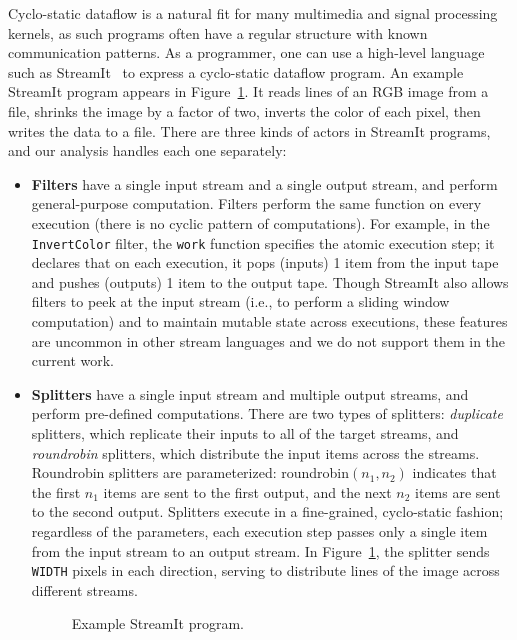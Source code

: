 Cyclo-static dataflow is a natural fit for many multimedia and signal
processing kernels, as such programs often have a regular structure
with known communication patterns.  As a programmer, one can use a
high-level language such as StreamIt~\cite{streamitcc} to express a
cyclo-static dataflow program.  An example StreamIt program appears in
Figure~\ref{fig:streamit}.  It reads lines of an RGB image from a
file, shrinks the image by a factor of two, inverts the color of each
pixel, then writes the data to a file.  There are three kinds of
actors in StreamIt programs, and our analysis handles each one
separately:
\begin{itemize}

\item {\bf Filters} have a single input stream and a single output
  stream, and perform general-purpose computation.  Filters perform
  the same function on every execution (there is no cyclic pattern of
  computations).  For example, in the {\tt InvertColor} filter, the
  {\tt work} function specifies the atomic execution step; it declares
  that on each execution, it pops (inputs) 1 item from the input tape
  and pushes (outputs) 1 item to the output tape.  Though StreamIt
  also allows filters to peek at the input stream (i.e., to perform a
  sliding window computation) and to maintain mutable state across
  executions, these features are uncommon in other stream languages
  and we do not support them in the current work.

\item {\bf Splitters} have a single input stream and multiple output
  streams, and perform pre-defined computations.  There are two types
  of splitters: {\it duplicate} splitters, which replicate their
  inputs to all of the target streams, and {\it roundrobin} splitters,
  which distribute the input items across the streams.  Roundrobin
  splitters are parameterized: roundrobin$(n_1, n_2)$ indicates that
  the first $n_1$ items are sent to the first output, and the next
  $n_2$ items are sent to the second output.  Splitters execute in a
  fine-grained, cyclo-static fashion; regardless of the parameters,
  each execution step passes only a single item from the input stream
  to an output stream.  In Figure~\ref{fig:streamit}, the splitter
  sends {\tt WIDTH} pixels in each direction, serving to distribute
  lines of the image across different streams.

\begin{figure}[t]
\caption{Example StreamIt program.
\protect\label{fig:streamit}}
\end{figure}


\end{itemize}
